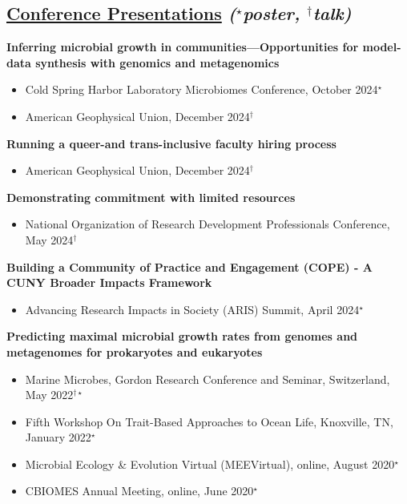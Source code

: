 \documentclass[]{res}
\begin{document}
\begin{resume}
 \section{\underline{Conference Presentations} \emph{{($^{\star}$poster, $^{\dagger}$talk)}}} \vspace{2mm}
 
 {\bf Inferring microbial growth in communities—Opportunities for model-data synthesis
with genomics and metagenomics}
 \begin{itemize}
 \item Cold Spring Harbor Laboratory Microbiomes Conference, October 2024$^{\star}$
 \item American Geophysical Union, December 2024$^{\dagger}$
 \end{itemize}  
 
  {\bf Running a queer-and trans-inclusive faculty hiring process}
 \begin{itemize}
 \item American Geophysical Union, December 2024$^{\dagger}$
 \end{itemize}  
 
 {\bf Demonstrating commitment with limited resources}
 \begin{itemize}
 \item National Organization of Research Development Professionals Conference, May 2024$^{\dagger}$
 \end{itemize} 
 
 {\bf Building a Community of Practice and Engagement (COPE) - A CUNY Broader Impacts Framework}
 \begin{itemize}
 \item Advancing Research Impacts in Society (ARIS) Summit, April 2024$^{\star}$
 \end{itemize}
 
 {\bf Predicting maximal microbial growth rates from genomes and metagenomes for prokaryotes and eukaryotes}
 \begin{itemize}
 \item Marine Microbes, Gordon Research Conference and Seminar, Switzerland, May 2022$^{\dagger\star}$
 \item Fifth Workshop On Trait-Based Approaches to Ocean Life, Knoxville, TN, January 2022$^{\star}$
 \item Microbial Ecology \& Evolution Virtual (MEEVirtual), online, August 2020$^{\star}$
 \item CBIOMES Annual Meeting, online, June 2020$^{\star}$
 \end{itemize}
 

\end{resume}
\end{document}
